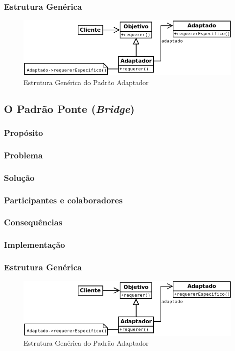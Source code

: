\subsubsection{Estrutura Genérica}

\begin{figure}[h]
\begin{center}
\includegraphics[scale=0.6]{adaptador.png}
\caption{Estrutura Genérica do Padrão Adaptador}\label{fig:adaptador}
\end{center}
\end{figure}

\subsection{O Padrão Ponte (\textit{Bridge})}
\subsubsection{Propósito}
\subsubsection{Problema}
\subsubsection{Solução}
\subsubsection{Participantes e colaboradores}
\subsubsection{Consequências}
\subsubsection{Implementação}
\subsubsection{Estrutura Genérica}

\begin{figure}[h]
\begin{center}
\includegraphics[scale=0.6]{adaptador.png}
\caption{Estrutura Genérica do Padrão Adaptador}\label{fig:adaptador}
\end{center}
\end{figure}

